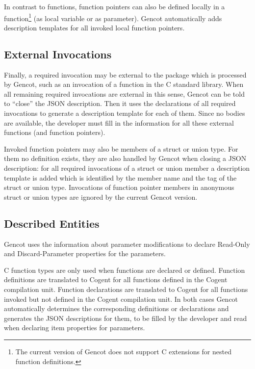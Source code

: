 In contrast to functions, function pointers can also be defined locally in a function\footnote{The current version of
Gencot does not support C extensions for nested function definitions.} (as local variable or as parameter). Gencot
automatically adds description templates for all invoked local function pointers.

\subsection{External Invocations}

Finally, a required invocation may be external to the package which is processed by Gencot, such as an invocation of
a function in the C standard library. When all remaining required invocations are external in this sense, Gencot
can be told to ``close'' the JSON description. Then it uses the declarations of all required invocations to generate
a description template for each of them. Since no bodies are available, the developer must fill in the information
for all these external functions (and function pointers).

Invoked function pointers may also be members of a struct or union type. For them no definition exists, they are also 
handled by Gencot when closing a JSON description: for all required invocations of a struct or union member a 
description template is added which is identified by the member name and the tag of the struct or union type. Invocations
of function pointer members in anonymous struct or union types are ignored by the current Gencot version.
 
\subsection{Described Entities}

Gencot uses the information about parameter modifications to declare Read-Only and Discard-Parameter properties
for the parameters. 

C function types are only used when functions are declared or defined. Function definitions are translated to
Cogent for all functions defined in the Cogent compilation unit. Function declarations are translated to Cogent
for all functions invoked but not defined in the Cogent compilation unit. In both cases Gencot automatically 
determines the corresponding definitions or declarations and generates the JSON descriptions for them, to be
filled by the developer and read when declaring item properties for parameters.

